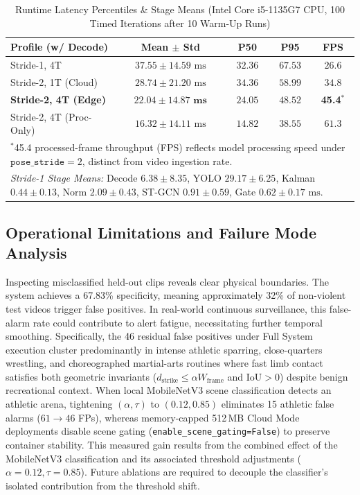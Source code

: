 \documentclass[conference]{IEEEtran}
\begin{document}
\begin{table}[htbp]
\caption{Runtime Latency Percentiles \& Stage Means (Intel Core i5-1135G7 CPU, 100 Timed Iterations after 10 Warm-Up Runs)}
\begin{center}
\begin{tabular}{lcccc}
\toprule
\textbf{Profile (w/ Decode)} & \textbf{Mean $\pm$ Std} & \textbf{P50} & \textbf{P95} & \textbf{FPS} \\
\midrule
Stride-1, 4T & $37.55 \pm 14.59\text{ ms}$ & $32.36$ & $67.53$ & $26.6$ \\
Stride-2, 1T (Cloud) & $28.74 \pm 21.20\text{ ms}$ & $34.36$ & $58.99$ & $34.8$ \\
\textbf{Stride-2, 4T (Edge)} & $\mathbf{22.04 \pm 14.87\text{ ms}}$ & $\mathbf{24.05}$ & $\mathbf{48.52}$ & \textbf{45.4$^*$} \\
Stride-2, 4T (Proc-Only) & $16.32 \pm 14.11\text{ ms}$ & $14.82$ & $38.55$ & $61.3$ \\
\midrule
\multicolumn{5}{l}{\scriptsize$^*$45.4 processed-frame throughput (FPS) reflects model processing speed under $\texttt{pose\_stride}=2$, distinct from video ingestion rate.} \\
\multicolumn{5}{l}{\scriptsize\textit{Stride-1 Stage Means:} Decode $6.38\pm 8.35$, YOLO $29.17\pm 6.25$, Kalman $0.44\pm 0.13$, Norm $2.09\pm 0.43$, ST-GCN $0.91\pm 0.59$, Gate $0.62\pm 0.17\text{ ms}$.} \\
\bottomrule
\end{tabular}
\label{tab:latency}
\end{center}
\end{table}

\subsection{Operational Limitations and Failure Mode Analysis}
Inspecting misclassified held-out clips reveals clear physical boundaries. The system achieves a 67.83\% specificity, meaning approximately 32\% of non-violent test videos trigger false positives. In real-world continuous surveillance, this false-alarm rate could contribute to alert fatigue, necessitating further temporal smoothing. Specifically, the 46 residual false positives under Full System execution cluster predominantly in intense athletic sparring, close-quarters wrestling, and choreographed martial-arts routines where fast limb contact satisfies both geometric invariants ($d_{\text{strike}} \le \alpha W_{\text{frame}}$ and $\text{IoU} > 0$) despite benign recreational context. When local MobileNetV3 scene classification detects an athletic arena, tightening $(\alpha, \tau)$ to $(0.12, 0.85)$ eliminates 15 athletic false alarms ($61 \to 46$ FPs), whereas memory-capped 512\,MB Cloud Mode deployments disable scene gating (\texttt{enable\_scene\_gating=False}) to preserve container stability. This measured gain results from the combined effect of the MobileNetV3 classification and its associated threshold adjustments ($\alpha=0.12, \tau=0.85$). Future ablations are required to decouple the classifier's isolated contribution from the threshold shift.
\end{document}
